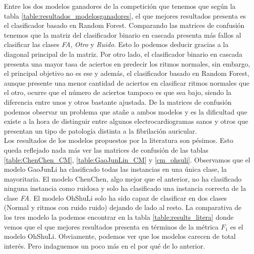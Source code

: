     Entre los dos modelos ganadores de la competición que tenemos que según la tabla \ref{table:resultados_modelosganadores}, el que mejores resultados presenta es el clasificador basado en Random Forest. Comparando las matrices de confusión tenemos que la matriz del clasificador binario en cascada presenta más fallos al clasificar las clases \textit{FA}, \textit{Otro} y \textit{Ruido}. Esto lo podemos deducir gracias a la diagonal principal de la matriz. Por otro lado, el clasificador binario en cascada presenta una mayor tasa de aciertos en predecir los ritmos normales, sin embargo, el principal objetivo no es ese y además, el clasificador basado en Random Forest, aunque presente una menor cantidad de aciertos en clasificar ritmos normales que el otro, ocurre que el número de aciertos tampoco es que sea bajo, siendo la diferencia entre unos y otros bastante ajustada. De la matrices de confusión podemos observar un problema que atañe a ambos modelos y es la dificultad que existe a la hora de distinguir entre algunos electrocardiogramas sanos y otros que presentan un tipo de patología distinta a la fibrilación auricular. \\
    
    Los resultados de los modelos propuestos por la literatura son pésimos. Esto queda reflejado nada más ver las matrices de confusión de las tablas \ref{table:ChenChen_CM}, \ref{table:GaoJunLin_CM} y \ref{cm_ohsuli}. Observamos que el modelo GaoJunLi ha clasificado todas las instancias en una única clase, la mayoritaria. El modelo ChenChen, algo mejor que el anterior, no ha clasificado ninguna instancia como ruidosa y solo ha clasificado una instancia correcta de la clase \textit{FA}. El modelo OhShuLi solo ha sido capaz de clasificar en dos clases (Normal y ritmos con ruido ruido) dejando de lado al resto. La comparativa de los tres modelo la podemos encontrar en la tabla \ref{table:results_litera} donde vemos que el que mejores resultados presenta en términos de la métrica $F_1$ es el modelo OhShuLi. Obviamente, podemos ver que los modelos carecen de total interés. Pero indaguemos un poco más en el por qué de lo anterior.\\


